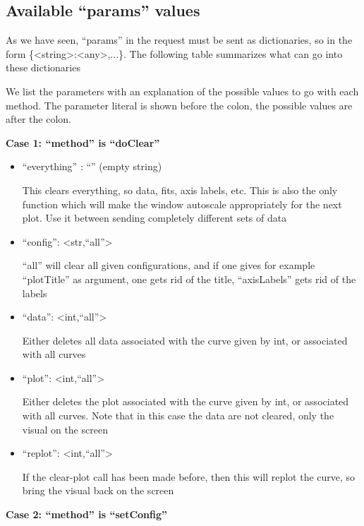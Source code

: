 \documentclass[11pt]{article} %
\begin{document}
\subsection{Available ``params'' values}

As we have seen, ``params'' in the request must be sent as dictionaries, so in the form \{<string>:<any>,...\}. The following table summarizes what can go into these dictionaries

\begin{tcolorbox}[breakable,title=Sending ``params'' to the server]

We list the parameters with an explanation of the possible values to go with each method. The parameter literal is shown before the colon, the possible values are after the colon.

\textbf{Case 1: ``method'' is ``doClear''}
\begin{itemize}
\item ``everything'' : ``'' (empty string) 

This clears everything, so data, fits, axis labels, etc. This is also the only function which will make the window 
autoscale appropriately for the next plot. Use it between sending completely different sets of data

\item ``config'': <str,``all''> 

``all'' will clear all given configurations, and if one gives for example ``plotTitle'' as argument, one gets rid
of the title, ``axisLabels'' gets rid of the labels

\item ``data'': <int,``all''> 

Either deletes all data associated with the curve given by int, or associated with all curves

\item ``plot'': <int,``all''>

Either deletes the plot associated with the curve given by int, or associated with all curves. 
Note that in this case the data are not cleared, only the visual on the screen

\item ``replot'': <int,``all''>

If the clear-plot call has been made before, then this will replot the curve, so bring the visual back on the screen

\end{itemize}
\textbf{Case 2: ``method'' is ``setConfig''}
\begin{itemize}


\end{itemize}
\end{tcolorbox}
\end{document}
